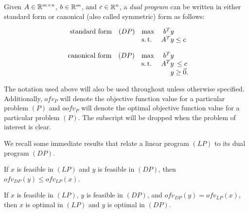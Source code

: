 \begin{defn}
    \label{defn:dual-program}
    Given $A \in \mathbb R^{m \times n}$, $b \in \mathbb R^m$, and $c \in \mathbb R^n$, a \textit{dual program} can be written in either standard form or canonical (also called symmetric) form as follows:
    \begin{multicols}{2}
        \noindent
        \begin{equation*}
        \begin{array}{lllr@{}c@{}r@{}l}
        \text{standard form} 
            & (DP)  & \max  & b^T y &           \\
            &       & \st   & A^T y & {}\le c   \\
        \end{array}
        \end{equation*}
        
        \noindent
        \begin{equation*}
        \begin{array}{lllr@{}c@{}r@{}l}
        \text{canonical form} 
            & (DP)  & \max  & b^T y &           \\
            &       & \st   & A^T y & {}\le c   \\
            &       &       &  y    & {}\ge \Vec{0}.
        \end{array}
        \end{equation*}
        \end{multicols}
\end{defn}

The notation used above will also be used throughout unless otherwise specified. Additionally, $ofv_P$ will denote the objective function value for a particular problem $(P)$ and $oofv_P$ will denote the optimal objective function value for a particular problem $(P)$. The subscript will be dropped when the problem of interest is clear.

We recall some immediate results that relate a linear program $(LP)$ to its dual program $(DP)$.

\begin{thm}
    \label{thm:weak-duality-LP}
    If $x$ is feasible in $(LP)$ and $y$ is feasible in $(DP)$, then $ofv_{DP}(y) \le ofv_{LP}(x)$.
\end{thm}

\begin{thm}
    \label{thm:supervisor-principle-LP}
    If $x$ is feasible in $(LP)$, $y$ is feasible in $(DP)$, and $ofv_{DP}(y) = ofv_{LP}(x)$, then $x$ is optimal in $(LP)$ and $y$ is optimal in $(DP)$.
\end{thm}

